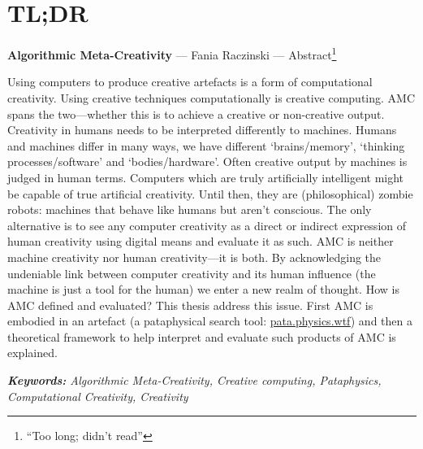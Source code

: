 
\pagestyle{empty}

\chapter{TL;DR}
\label{abstract}

{\Large \textbf{Algorithmic Meta-Creativity}} --- Fania Raczinski --- Abstract\footnote{``Too long; didn't read''}

\vspace{0.2cm}

Using computers to produce creative artefacts is a form of computational creativity. Using creative techniques computationally is creative computing. \ac{AMC} spans the two---whether this is to achieve a creative or non-creative output. Creativity in humans needs to be interpreted differently to machines. Humans and machines differ in many ways, we have different `brains/memory', `thinking processes/software' and `bodies/hardware'. Often creative output by machines is judged in human terms. Computers which are truly artificially intelligent might be capable of true artificial creativity. Until then, they are (philosophical) zombie robots: machines that behave like humans but aren't conscious. The only alternative is to see any computer creativity as a direct or indirect expression of human creativity using digital means and evaluate it as such. \ac{AMC} is neither machine creativity nor human creativity---it is both. By acknowledging the undeniable link between computer creativity and its human influence (the machine is just a tool for the human) we enter a new realm of thought. How is \ac{AMC} defined and evaluated? This thesis address this issue. First \ac{AMC} is embodied in an artefact (a pataphysical search tool: \url{pata.physics.wtf}) and then a theoretical framework to help interpret and evaluate such products of \ac{AMC} is explained.

\textit{\textbf{Keywords:} Algorithmic Meta-Creativity, Creative computing, Pataphysics, Computational Creativity, Creativity}

\cleardoublepage
